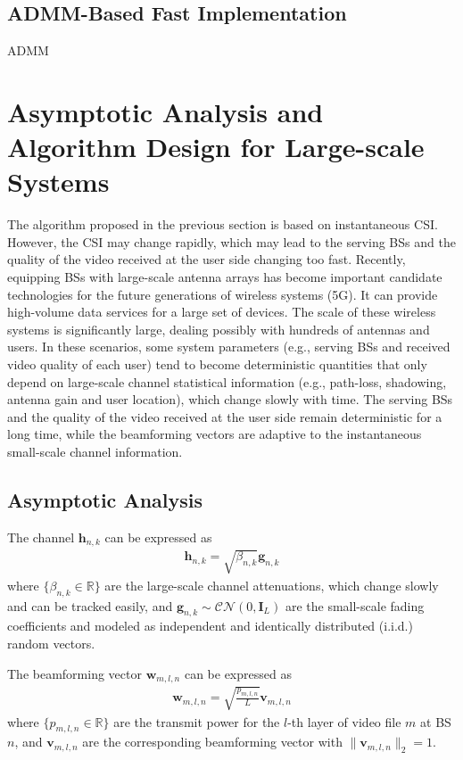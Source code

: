 \documentclass[12pt, draftclsnofoot, onecolumn]{IEEEtran}
\begin{document}
\subsection{ADMM-Based Fast Implementation}
ADMM


\section{Asymptotic Analysis and Algorithm Design for Large-scale Systems}
The algorithm proposed in the previous section is based on instantaneous CSI. However, the CSI may change rapidly, which may lead to the serving BSs and the quality of the video received at the user side changing too fast. 
Recently, equipping BSs with large-scale antenna arrays has become important candidate technologies for the future generations of wireless systems (5G). It can provide high-volume data services for a large set of devices. The scale of these wireless systems is significantly large, dealing possibly with hundreds of antennas and users. In these scenarios, some system parameters (e.g., serving BSs and received video quality of each user) tend to become deterministic quantities that only depend on large-scale channel statistical information (e.g., path-loss, shadowing, antenna gain and user location), which change slowly with time. The serving BSs and the quality of the video received at the user side remain deterministic for a long time, while the beamforming vectors are adaptive to the instantaneous small-scale channel information.

\subsection{Asymptotic Analysis}
The channel $\mathbf{h}_{n,k}$ can be expressed as
\begin{align}
\mathbf{h}_{n,k} = \sqrt{\beta_{n,k}} \mathbf{g}_{n,k}
\end{align} 
where $\{\beta_{n,k} \in \mathbb{R} \}$ are the large-scale channel attenuations, which change slowly and can be tracked easily, and $\mathbf{g}_{n,k} \sim \mathcal{CN}(0, \mathbf{I}_{L})$ are the small-scale fading coefficients and modeled as independent and identically distributed (i.i.d.) random vectors.

The beamforming vector $\mathbf{w}_{m,l,n}$ can be expressed as
\begin{align}
\mathbf{w}_{m,l,n} = \sqrt{\frac{p_{m,l,n}}{L}} \mathbf{v}_{m,l,n}
\end{align} 
where $\{p_{m,l,n} \in \mathbb{R} \}$ are the transmit power for the $l$-th layer of video file $m$ at BS $n$, and $\mathbf{v}_{m,l,n}$ are the corresponding beamforming vector with $\lVert \mathbf{v}_{m,l,n} \rVert_2 = 1$.
\end{document}

